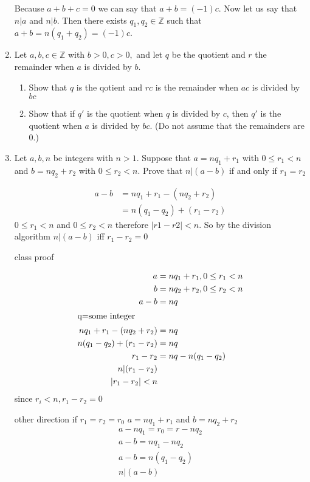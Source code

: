 \documentclass[letterpaper]{article}
\begin{document}
\begin{enumerate}
Because $a+b+c=0$ we can say that $a+b=(-1)c$. Now let us say that $n\vert a$ and $n\vert b$. Then there exists $q_1, q_2\in\mathbb{Z}$ such that $a+b=n(q_1+q_2)=(-1)c$.
\setcounter{enumi}{15}
\item
Let $a,b,c\in\mathbb{Z}$ with $b>0,c>0,$ and let $q$ be the quotient and $r$ the remainder when $a$ is divided by $b$.
  \begin{enumerate}
  \item Show that $q$ is the qotient and $rc$ is the remainder when $ac$ is divided by $bc$
  \item Show that if $q'$ is the quotient when $q$ is divided by $c$, then $q'$ is the quotient when $a$ is divided by $bc$. (Do not assume that the remainders are 0.)
  \end{enumerate}
\item
Let $a,b,n$ be integers with $n>1$. Suppose that $a=nq_1+r_1$ with $0\le r_1<n$ and $b=nq_2+r_2$ with $0\le r_2<n$. Prove that $n\vert (a-b)$ if and only if $r_1=r_2$

\begin{align*}
  a-b&=nq_1+r_1-(nq_2+r_2)\\
  &=n(q_1-q_2)+(r_1-r_2)
\end{align*}
$0\le r_1<n$ and $0\le r_2<n$ therefore $\left\lvert r1-r2\right\rvert<n$. So by the division algorithm $n|(a-b)$ iff $r_1-r_2=0$

class proof

\begin{align*}
  a&=nq_1+r_1,0\le r_1< n\\
  b&=nq_2+r_2,0\le r_2<n\\
  a-b&=nq\\
  \intertext{q=some integer}
  nq_1+r_1-(nq_2+r_2)&=nq\\
  n(q_1-q_2)+(r_1-r_2)&=nq\\
  r_1-r_2&=nq-n(q_1-q_2)\\
  n\vert (r_1-r_2)\\
  \left\lvert r_1-r_2\right\rvert<n
\end{align*}
since $r_i<n, r_1-r_2=0$


other direction
if $r_1=r_2=r_0$ $a=nq_1+r_1$ and $b=nq_2+r_2$
\begin{align*}
  a-nq_1=r_0=r-nq_2\\
  a-b=nq_1-nq_2\\
  a-b=n(q_1-q_2)\\
  n\vert(a-b)
\end{align*}
\end{enumerate}
\end{document}
